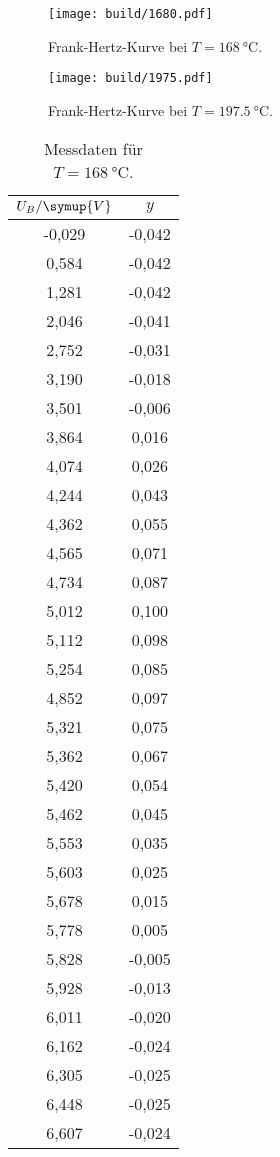 \begin{figure}[H]
	\texttt{[image: build/1680.pdf]}
	\caption{Frank-Hertz-Kurve bei $T=\SI{168}{\celsius}$.}
	\label{fig:1680}
\end{figure}
\begin{figure}[H]
	\texttt{[image: build/1975.pdf]}
	\caption{Frank-Hertz-Kurve bei $T=\SI{197.5}{\celsius}$.}
	\label{fig:1975}
\end{figure}
\begin{longtable}{c c}
	\caption{Messdaten für $T=\SI{168}{\celsius}$.}
	\label{tab:148}\\
	\hline
	$U_B / \symup{V}$ & $y$ \\
	\hline
	-0,029&-0,042 \\
	0,584&-0,042 \\
	1,281&-0,042 \\
	2,046&-0,041 \\
	2,752&-0,031 \\
	3,190&-0,018 \\
	3,501&-0,006 \\
	3,864&0,016 \\
	4,074&0,026 \\
	4,244&0,043 \\
	4,362&0,055 \\
	4,565&0,071 \\
	4,734&0,087 \\
	5,012&0,100 \\
	5,112&0,098 \\
	5,254&0,085 \\
	4,852&0,097 \\
	5,321&0,075 \\
	5,362&0,067 \\
	5,420&0,054 \\
	5,462&0,045 \\
	5,553&0,035 \\
	5,603&0,025 \\
	5,678&0,015 \\
	5,778&0,005 \\
	5,828&-0,005 \\
	5,928&-0,013 \\
	6,011&-0,020 \\
	6,162&-0,024 \\
	6,305&-0,025 \\
	6,448&-0,025 \\
	6,607&-0,024 \\

\end{longtable}
